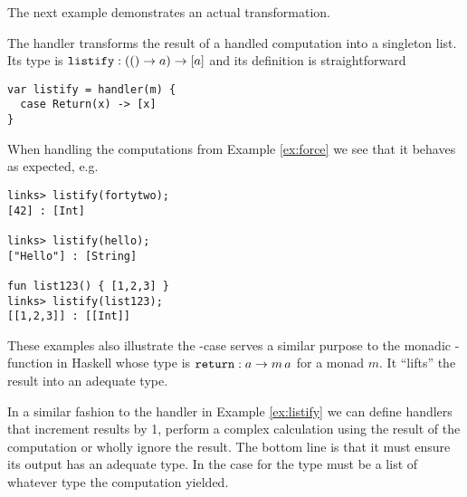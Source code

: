 The next example demonstrates an actual transformation.
\begin{example}\label{ex:listify}
The  handler transforms the result of a handled computation into a singleton list. Its type is $\texttt{listify} : (() \to a) \to [a]$ and its definition is straightforward
\begin{lstlisting}[style=links]
var listify = handler(m) {
  case Return(x) -> [x]
}
\end{lstlisting}
When handling the computations from Example \ref{ex:force} we see that it behaves as expected, e.g.
\begin{lstlisting}[style=links]
links> listify(fortytwo);
[42] : [Int]

links> listify(hello);
["Hello"] : [String]

fun list123() { [1,2,3] }
links> listify(list123);
[[1,2,3]] : [[Int]]
\end{lstlisting}
These examples also illustrate the -case serves a similar purpose to the monadic -function in Haskell whose type is $\texttt{return} : a \to m\, a$ for a monad $m$. It ``lifts'' the result into an adequate type.
\end{example}

In a similar fashion to the handler  in Example \ref{ex:listify} we can define handlers that increment results by 1, perform a complex calculation using the result of the computation or wholly ignore the result. The bottom line is that it must ensure its output has an adequate type. In the case for  the type must be a list of whatever type the computation yielded.

